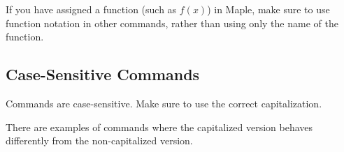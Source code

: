 If you have assigned a function (such as $f(x)$) in Maple, make sure to use function notation in other commands, rather than using only the name of the function.

\begin{maplegroup}
\begin{mapleinput}
\end{mapleinput}
\mapleresult
\begin{maplelatex}
\end{maplelatex}
\mapleresult
\begin{maplelatex}
\end{maplelatex}
\end{maplegroup}

\subsection{Case-Sensitive Commands}

Commands are case-sensitive. Make sure to use the correct capitalization.

\begin{maplegroup}
\begin{mapleinput}
\end{mapleinput}
\mapleresult
\begin{maplelatex}
\end{maplelatex}
\end{maplegroup}

There are examples of commands where the capitalized version behaves differently from the non-capitalized version.

